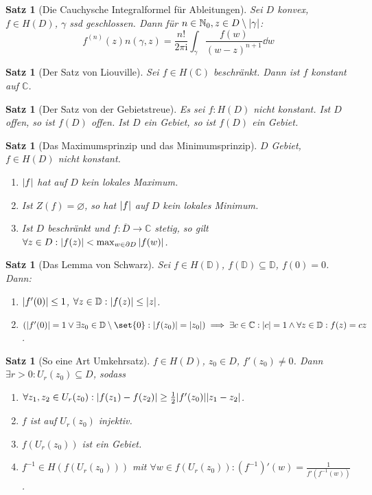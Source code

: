 \documentclass[a4paper]{article}
\theoremstyle{marginbreak}
\newtheorem{satz}[definition]{Satz}
\newcommand{\C}{\mathbb{C}}
\renewcommand{\i}{\mathrm{i}}
\newcommand{\D}{\mathbb{D}}
\begin{document}
	\begin{satz}[Die Cauchysche Integralformel für Ableitungen]
		Sei $D$ konvex, $f\in H(D)$, $\gamma$ ssd geschlossen. Dann für $n\in\mathbb{N}_0, z\in D\setminus\abs{\gamma}$:
		\[
			f^{(n)}(z)n(\gamma, z) = \frac{n!}{2\pi\i}\int_\gamma \frac{f(w)}{(w-z)^{n+1}}\dd{w}
		\]
	\end{satz}
	\begin{satz}[Der Satz von Liouville]
		Sei $f\in H(\C)$ beschränkt. Dann ist $f$ konstant auf $\C$.
	\end{satz}
	\begin{satz}[Der Satz von der Gebietstreue]
		Es sei $f\colon H(D)$ nicht konstant. Ist $D$ offen, so ist $f(D)$ offen. Ist $D$ ein Gebiet, so ist $f(D)$ ein Gebiet.
	\end{satz}
	\begin{satz}[Das Maximumsprinzip und das Minimumsprinzip]
		$D$ Gebiet, $f\in H(D)$ nicht konstant.
		\begin{enumerate}[label=(\alph*)]
			\item $\abs{f}$ hat auf $D$ kein lokales Maximum.
			\item Ist $Z(f)=\varnothing$, so hat $\abs{f}$ auf $D$ kein lokales Minimum.
			\item Ist $D$ beschränkt und $f\colon\overline{D}\to\C$ stetig, so gilt $\forall z\in D: \abs{f(z)} < \max_{w\in\partial D}\abs{f(w)}$.
		\end{enumerate}
	\end{satz}
	\begin{satz}[Das Lemma von Schwarz]
		Sei $f\in H(\D)$, $f(\D)\subseteq\D$, $f(0)=0$. Dann:
		\begin{enumerate}[label=(\alph*)]
			\item $\abs{f'(0)}\leq 1$, $\forall z\in\D:\abs{f(z)}\leq \abs{z}$.
			\item $(\abs{f'(0)}=1\vee\exists z_0\in\D\setminus\set{0}:\abs{f(z_0)}=\abs{z_0})\implies\exists c\in\C:\abs{c}=1\wedge\forall z\in\D:
				f(z)=cz$.
		\end{enumerate}
	\end{satz}
	\begin{satz}[So eine Art Umkehrsatz]
		$f\in H(D)$, $z_0\in D$, $f'(z_0)\neq 0$. Dann $\exists r>0:U_r(z_0)\subseteq D$, sodass
		\begin{enumerate}[label=(\alph*)]
			\item $\forall z_1, z_2\in U_r(z_0): \abs{f(z_1)-f(z_2)}\geq\frac{1}{2}\abs{f'(z_0)}\abs{z_1-z_2}$.
			\item $f$ ist auf $U_r(z_0)$ injektiv.
			\item $f(U_r(z_0))$ ist ein Gebiet.
			\item $f^{-1}\in H(f(U_r(z_0)))$ mit $\forall w\in f(U_r(z_0)): (f^{-1})'(w)=\frac{1}{f'(f^{-1}(w))}$.
		\end{enumerate}
	\end{satz}
\end{document}
